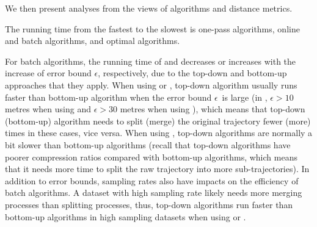 {%



We then present analyses from the views of \lsa algorithms and distance metrics.



The running time from the fastest to the slowest is one-pass algorithms, online and batch algorithms, and optimal algorithms.

For batch algorithms, the running time of \dpa and \tpa decreases or increases with the increase of error bound $\epsilon$, respectively, due to the top-down and bottom-up approaches that they apply. When using \ped or \sed, top-down algorithm usually runs faster than bottom-up algorithm when the error bound $\epsilon$~is large (\eg in \geolife, $\epsilon >10$ metres when using \ped and $\epsilon >30$ metres when using \sed), which means that top-down (bottom-up) algorithm needs to split (merge) the original trajectory fewer (more) times in these cases, vice versa. When using \dad,  top-down algorithms are normally a bit slower than bottom-up algorithms (recall that top-down algorithms have poorer compression ratios compared with bottom-up algorithms, which means that it needs more time to split the raw trajectory into more sub-trajectories).
In addition to error bounds, sampling rates also have impacts on the efficiency of batch algorithms. A dataset with high sampling rate likely needs more merging processes than splitting processes, thus, top-down algorithms run faster than bottom-up algorithms in high sampling datasets when using \ped or \sed.



}
